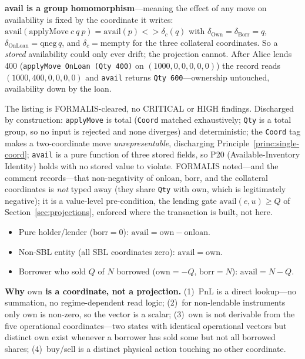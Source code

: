 \noindent\textbf{avail is a group homomorphism}---meaning the effect of any move on availability is fixed by the coordinate it writes: $\mathrm{avail}(\mathrm{applyMove}\ c\ q\ p) = \mathrm{avail}(p) \mathbin{<\!\!>} \delta_c(q)$ with $\delta_{\mathrm{Own}}=\delta_{\mathrm{Borr}}=q$, $\delta_{\mathrm{OnLoan}}=\mathrm{qneg}\,q$, and $\delta_c=\mathrm{mempty}$ for the three collateral coordinates. So a \emph{stored} availability could only ever drift; the projection cannot. After Alice lends 400 (\verb|applyMove OnLoan (Qty 400)| on $(1000,0,0,0,0,0)$) the record reads $(1000,400,0,0,0,0)$ and \verb|avail| returns \verb|Qty 600|---ownership untouched, availability down by the loan.

\begin{remark}
The listing is FORMALIS-cleared, no CRITICAL or HIGH findings. Discharged by construction: \verb|applyMove| is total (\verb|Coord| matched exhaustively; \verb|Qty| is a total group, so no input is rejected and none diverges) and deterministic; the \verb|Coord| tag makes a two-coordinate move \emph{unrepresentable}, discharging Principle~\ref{princ:single-coord}; \verb|avail| is a pure function of three stored fields, so P20 (Available-Inventory Identity) holds with no stored value to violate. FORMALIS noted---and the comment records---that non-negativity of $\mathrm{onloan}$, $\mathrm{borr}$, and the collateral coordinates is \emph{not} typed away (they share \verb|Qty| with $\mathrm{own}$, which is legitimately negative); it is a value-level pre-condition, the lending gate $\mathrm{avail}(e,u)\geq Q$ of Section~\ref{sec:projections}, enforced where the transaction is built, not here.
\end{remark}

\begin{remark}
\hfill
\begin{itemize}[nosep]
\item Pure holder/lender ($\mathrm{borr}=0$): $\mathrm{avail} = \mathrm{own} - \mathrm{onloan}$.
\item Non-SBL entity (all SBL coordinates zero): $\mathrm{avail} = \mathrm{own}$.
\item Borrower who sold $Q$ of $N$ borrowed ($\mathrm{own}=-Q$, $\mathrm{borr}=N$): $\mathrm{avail} = N - Q$.
\end{itemize}
\end{remark}

\noindent\textbf{Why $\mathrm{own}$ is a coordinate, not a projection.} (1)~PnL is a direct lookup---no summation, no regime-dependent read logic; (2)~for non-lendable instruments only $\mathrm{own}$ is non-zero, so the vector is a scalar; (3)~$\mathrm{own}$ is not derivable from the five operational coordinates---two states with identical operational vectors but distinct $\mathrm{own}$ exist whenever a borrower has sold some but not all borrowed shares; (4)~buy/sell is a distinct physical action touching no other coordinate.

